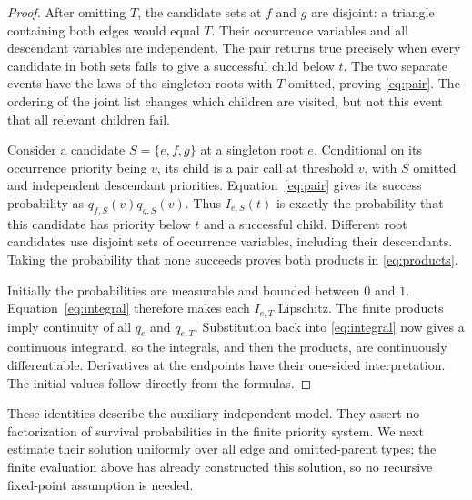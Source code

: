 \begin{proof}
After omitting $T$, the candidate sets at $f$ and $g$ are disjoint:
a triangle containing both edges would equal $T$.  Their occurrence
variables and all descendant variables are independent.  The pair
returns true precisely when every candidate in both sets fails to
give a successful child below $t$.  The two separate events have the
laws of the singleton roots with $T$ omitted, proving
\eqref{eq:pair}.  The ordering of the joint list changes which children
are visited, but not this event that all relevant children fail.

Consider a candidate $S=\{e,f,g\}$ at a singleton root $e$.
Conditional on its occurrence priority being $v$, its child is a pair
call at threshold $v$, with $S$ omitted and independent descendant
priorities.  Equation~\eqref{eq:pair} gives its success probability as
$q_{f,S}(v)q_{g,S}(v)$.  Thus $I_{e,S}(t)$ is exactly the probability
that this candidate has priority below $t$ and a successful child.
Different root candidates use disjoint sets of occurrence variables,
including their descendants.  Taking the probability that none
succeeds proves both products in \eqref{eq:products}.

Initially the probabilities are measurable and bounded between $0$
and $1$.  Equation~\eqref{eq:integral} therefore makes each $I_{e,T}$
Lipschitz.  The finite products imply continuity of all $q_e$ and
$q_{e,T}$.  Substitution back into \eqref{eq:integral} now gives a
continuous integrand, so the integrals, and then the products, are
continuously differentiable.  Derivatives at the endpoints have their
one-sided interpretation.  The initial values follow directly from
the formulas.
\end{proof}

These identities describe the auxiliary independent model.  They
assert no factorization of survival probabilities in the finite
priority system.  We next estimate their solution uniformly over all
edge and omitted-parent types; the finite evaluation above has already
constructed this solution, so no recursive fixed-point assumption is
needed.
